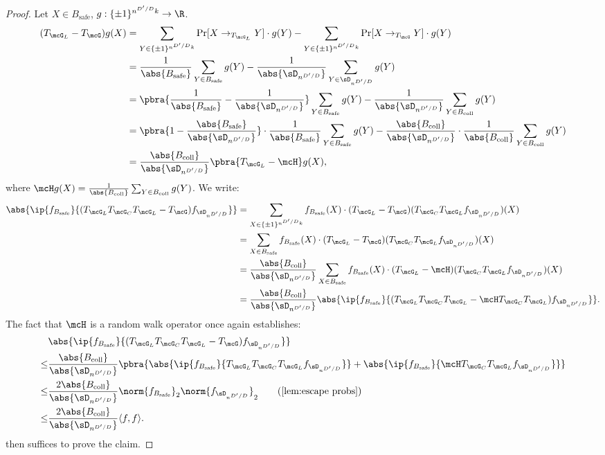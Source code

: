 \begin{proof}
Let $X \in B_{\mathrm{safe}}$, $g : \{\pm1\}^{n^{D'/D}k} \to \R$.
\begin{align*}
    (T_{\mcG_L} - T_\mcG)g(X) &= \sum_{Y \in \{\pm1\}^{n^{D'/D}k}} \Pr[X \to_{T_{\mcG_L}} Y] \cdot g(Y) - \sum_{Y \in \{\pm1\}^{n^{D'/D}k}} \Pr[X \to_{T_{\mcG}} Y] \cdot g(Y)\\
    &= \frac{1}{\abs{B_{\mathrm{safe}}}}\sum_{Y \in B_{\mathrm{safe}}} g(Y) - \frac{1}{\abs{\sD_{n^{D'/D}}}}\sum_{Y \in \sD_{n^{D'/D}}} g(Y)\\
    &= \pbra{\frac{1}{\abs{B_{\mathrm{safe}}}} - \frac{1}{\abs{\sD_{n^{D'/D}}}}}\sum_{Y \in B_{\mathrm{safe}}} g(Y) - \frac{1}{\abs{\sD_{n^{D'/D}}}}\sum_{Y \in B_{\mathrm{coll}}} g(Y)\\
    &= \pbra{1 - \frac{\abs{B_{\mathrm{safe}}}}{\abs{\sD_{n^{D'/D}}}}} \cdot \frac{1}{\abs{B_{\mathrm{safe}}}}\sum_{Y \in B_{\mathrm{safe}}} g(Y) - \frac{\abs{B_{\mathrm{coll}}}}{\abs{\sD_{n^{D'/D}}}} \cdot \frac{1}{\abs{B_{\mathrm{coll}}}}\sum_{Y \in B_{\mathrm{coll}}} g(Y)\\
    &= \frac{\abs{B_{\mathrm{coll}}}}{\abs{\sD_{n^{D'/D}}}} \pbra{T_{\mcG_L} - \mcH}g(X),
\end{align*}
where $\mcH g(X) = \frac{1}{\abs{B_{\mathrm{coll}}}}\sum_{Y \in B_{\mathrm{coll}}} g(Y)$. We write:
\begin{align*}
    \abs{\ip{f_{B_{\mathrm{safe}}}}{(T_{\mcG_L}T_{\mcG_C}T_{\mcG_L} - T_\mcG) f_{\sD_{n^{D'/D}}}}} &= \sum_{X \in \{\pm1\}^{n^{D'/D}k}} f_{B_{\mathrm{safe}}}(X) \cdot (T_{\mcG_L}-T_\mcG)(T_{\mcG_C}T_{\mcG_L}f_{\sD_{n^{D'/D}}})(X)\\
    &= \sum_{X \in B_{\mathrm{safe}}} f_{B_{\mathrm{safe}}}(X) \cdot (T_{\mcG_L}-T_\mcG)(T_{\mcG_C}T_{\mcG_L}f_{\sD_{n^{D'/D}}})(X)\\
    &= \frac{\abs{B_{\mathrm{coll}}}}{\abs{\sD_{n^{D'/D}}}} \sum_{X \in B_{\mathrm{safe}}} f_{B_{\mathrm{safe}}}(X) \cdot (T_{\mcG_L}-\mcH)(T_{\mcG_C}T_{\mcG_L}f_{\sD_{n^{D'/D}}})(X)\\
    &= \frac{\abs{B_{\mathrm{coll}}}}{\abs{\sD_{n^{D'/D}}}} \abs{\ip{f_{B_{\mathrm{safe}}}}{(T_{\mcG_L}T_{\mcG_C}T_{\mcG_L} - \mcH T_{\mcG_C}T_{\mcG_L}) f_{\sD_{n^{D'/D}}}}}.
\end{align*}
The fact that $\mcH$ is a random walk operator once again establishes:
\begin{align*}
    &\abs{\ip{f_{B_{\mathrm{safe}}}}{(T_{\mcG_L}T_{\mcG_C}T_{\mcG_L} - T_\mcG) f_{\sD_{n^{D'/D}}} }} \\
    \leq &\frac{\abs{B_{\mathrm{coll}}}}{\abs{\sD_{n^{D'/D}}}} \pbra{\abs{\ip{f_{B_{\mathrm{safe}}}}{T_{\mcG_L}T_{\mcG_C}T_{\mcG_L} f_{\sD_{n^{D'/D}}}}} + \abs{\ip{f_{B_{\mathrm{safe}}}}{\mcH T_{\mcG_C}T_{\mcG_L} f_{\sD_{n^{D'/D}}}}}}\\
    \leq& \frac{2\abs{B_{\mathrm{coll}}}}{\abs{\sD_{n^{D'/D}}}} \norm{f_{B_{\mathrm{safe}}}}_{2} \norm{f_{\sD_{n^{D'/D}}}}_{2} \tag{\Cref{lem:escape probs}}\\
    \leq& \frac{2\abs{B_{\mathrm{coll}}}}{\abs{\sD_{n^{D'/D}}}} \langle f, f \rangle.
\end{align*}
 then suffices to prove the claim. \end{proof}

